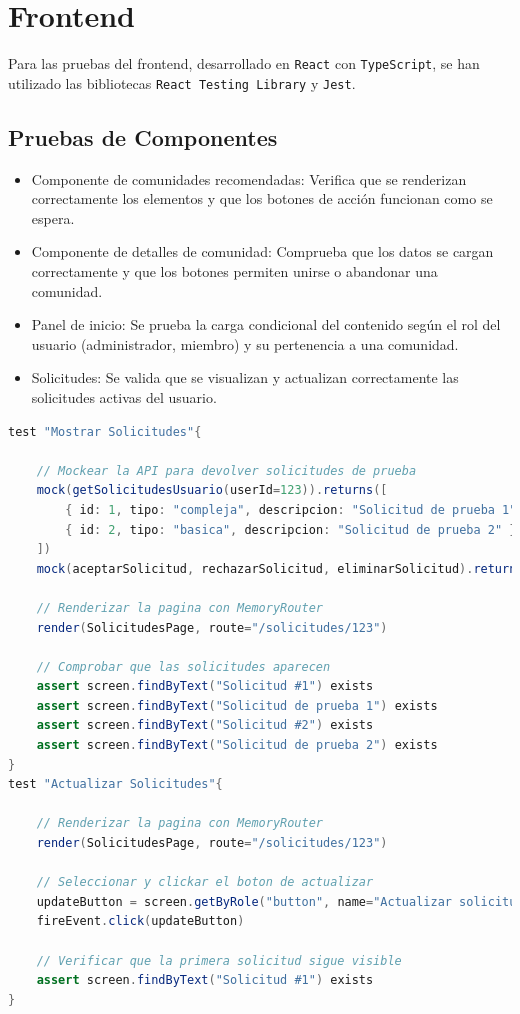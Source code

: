 \section{Frontend}

Para las pruebas del frontend, desarrollado en \texttt{React} con \texttt{TypeScript}, se han utilizado las bibliotecas \texttt{React Testing Library} y \texttt{Jest}.

\subsection{Pruebas de Componentes}
\begin{itemize}
    \item Componente de comunidades recomendadas: Verifica que se renderizan correctamente los elementos y que los botones de acción funcionan como se espera.
    \item Componente de detalles de comunidad: Comprueba que los datos se cargan correctamente y que los botones permiten unirse o abandonar una comunidad.
    \item Panel de inicio: Se prueba la carga condicional del contenido según el rol del usuario (administrador, miembro) y su pertenencia a una comunidad.
    \item Solicitudes: Se valida que se visualizan y actualizan correctamente las solicitudes activas del usuario.
\end{itemize}

\begin{lstlisting}[language=Java, caption={Pseudocódigo del test de visualización y actualización de solicitudes}]
test "Mostrar Solicitudes"{
    
    // Mockear la API para devolver solicitudes de prueba
    mock(getSolicitudesUsuario(userId=123)).returns([
        { id: 1, tipo: "compleja", descripcion: "Solicitud de prueba 1" },
        { id: 2, tipo: "basica", descripcion: "Solicitud de prueba 2" }
    ])
    mock(aceptarSolicitud, rechazarSolicitud, eliminarSolicitud).returns({})

    // Renderizar la pagina con MemoryRouter
    render(SolicitudesPage, route="/solicitudes/123")

    // Comprobar que las solicitudes aparecen
    assert screen.findByText("Solicitud #1") exists
    assert screen.findByText("Solicitud de prueba 1") exists
    assert screen.findByText("Solicitud #2") exists
    assert screen.findByText("Solicitud de prueba 2") exists
}
test "Actualizar Solicitudes"{
    
    // Renderizar la pagina con MemoryRouter
    render(SolicitudesPage, route="/solicitudes/123")

    // Seleccionar y clickar el boton de actualizar
    updateButton = screen.getByRole("button", name="Actualizar solicitudes")
    fireEvent.click(updateButton)

    // Verificar que la primera solicitud sigue visible
    assert screen.findByText("Solicitud #1") exists
}
\end{lstlisting}
